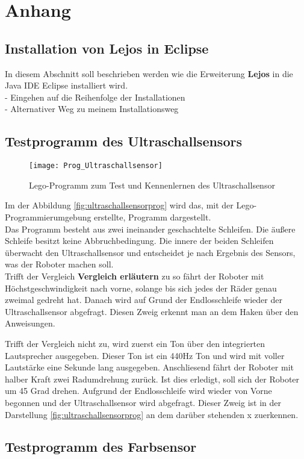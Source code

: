\chapter{Anhang}
\section{Installation von Lejos in Eclipse}
In diesem Abschnitt soll beschrieben werden wie die Erweiterung \textbf{Lejos} in die Java IDE Eclipse installiert wird.\\ 
- Eingehen auf die Reihenfolge der Installationen\\
- Alternativer Weg zu meinem Installationsweg \\
\section{Testprogramm des Ultraschallsensors}
\begin{figure}[htb]
\centering
\texttt{[image: Prog\_Ultraschallsensor]}
\caption{Lego-Programm zum Test und Kennenlernen des Ultraschallsensor}
\label{fig:ultraschallsensorprog}
\end{figure}
Im der Abbildung \vref{fig:ultraschallsensorprog} wird das, mit der Lego-Programmierumgebung erstellte, Programm dargestellt.\\
Das Programm besteht aus zwei ineinander geschachtelte Schleifen. Die äußere Schleife besitzt keine Abbruchbedingung. Die innere der beiden Schleifen überwacht den Ultraschallsensor und entscheidet je nach Ergebnis des Sensors, was der Roboter machen soll.\\
Trifft der Vergleich \textbf{Vergleich erläutern} zu so fährt der Roboter mit Höchstgeschwindigkeit nach vorne, solange bis sich jedes der Räder genau zweimal gedreht hat. Danach wird auf Grund der Endlosschleife wieder der Ultraschallsensor abgefragt. Diesen Zweig erkennt man an dem Haken über den Anweisungen.

Trifft der Vergleich nicht zu, wird zuerst ein Ton über den integrierten Lautsprecher ausgegeben. Dieser Ton ist ein 440Hz Ton und wird mit voller Lautstärke eine Sekunde lang ausgegeben. Anschliesend fährt der Roboter mit halber Kraft zwei Radumdrehung zurück. Ist dies erledigt, soll sich der Roboter um 45 Grad drehen. Aufgrund der Endlosschleife wird wieder von Vorne begonnen und der Ultraschallsensor wird abgefragt. Dieser Zweig ist in der Darstellung \vref{fig:ultraschallsensorprog} an dem darüber stehenden x zuerkennen.

\section{Testprogramm des Farbsensor}


